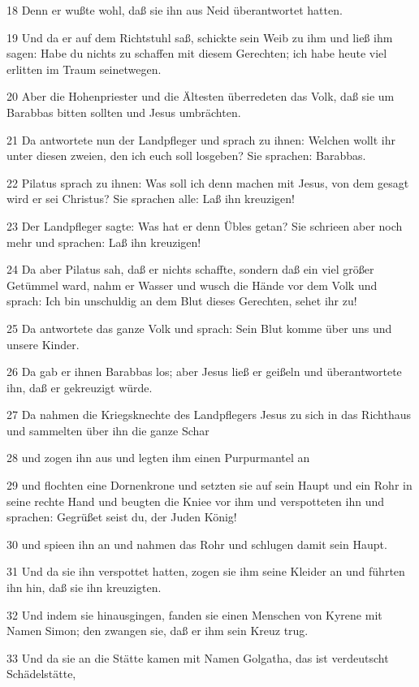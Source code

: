 \par 18 Denn er wußte wohl, daß sie ihn aus Neid überantwortet hatten.
\par 19 Und da er auf dem Richtstuhl saß, schickte sein Weib zu ihm und ließ ihm sagen: Habe du nichts zu schaffen mit diesem Gerechten; ich habe heute viel erlitten im Traum seinetwegen.
\par 20 Aber die Hohenpriester und die Ältesten überredeten das Volk, daß sie um Barabbas bitten sollten und Jesus umbrächten.
\par 21 Da antwortete nun der Landpfleger und sprach zu ihnen: Welchen wollt ihr unter diesen zweien, den ich euch soll losgeben? Sie sprachen: Barabbas.
\par 22 Pilatus sprach zu ihnen: Was soll ich denn machen mit Jesus, von dem gesagt wird er sei Christus? Sie sprachen alle: Laß ihn kreuzigen!
\par 23 Der Landpfleger sagte: Was hat er denn Übles getan? Sie schrieen aber noch mehr und sprachen: Laß ihn kreuzigen!
\par 24 Da aber Pilatus sah, daß er nichts schaffte, sondern daß ein viel größer Getümmel ward, nahm er Wasser und wusch die Hände vor dem Volk und sprach: Ich bin unschuldig an dem Blut dieses Gerechten, sehet ihr zu!
\par 25 Da antwortete das ganze Volk und sprach: Sein Blut komme über uns und unsere Kinder.
\par 26 Da gab er ihnen Barabbas los; aber Jesus ließ er geißeln und überantwortete ihn, daß er gekreuzigt würde.
\par 27 Da nahmen die Kriegsknechte des Landpflegers Jesus zu sich in das Richthaus und sammelten über ihn die ganze Schar
\par 28 und zogen ihn aus und legten ihm einen Purpurmantel an
\par 29 und flochten eine Dornenkrone und setzten sie auf sein Haupt und ein Rohr in seine rechte Hand und beugten die Kniee vor ihm und verspotteten ihn und sprachen: Gegrüßet seist du, der Juden König!
\par 30 und spieen ihn an und nahmen das Rohr und schlugen damit sein Haupt.
\par 31 Und da sie ihn verspottet hatten, zogen sie ihm seine Kleider an und führten ihn hin, daß sie ihn kreuzigten.
\par 32 Und indem sie hinausgingen, fanden sie einen Menschen von Kyrene mit Namen Simon; den zwangen sie, daß er ihm sein Kreuz trug.
\par 33 Und da sie an die Stätte kamen mit Namen Golgatha, das ist verdeutscht Schädelstätte,
